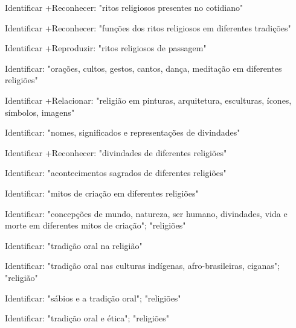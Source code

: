 Identificar +Reconhecer: "ritos religiosos presentes no cotidiano"

 Identificar +Reconhecer: "funções dos ritos religiosos em diferentes tradições"

 Identificar +Reproduzir: "ritos religiosos de passagem"

 Identificar: "orações, cultos, gestos, cantos, dança, meditação em diferentes religiões"

 Identificar +Relacionar: "religião em pinturas, arquitetura, esculturas, ícones, símbolos, imagens"

 Identificar: "nomes, significados e representações de divindades"

 Identificar +Reconhecer: "divindades de diferentes religiões"

 Identificar: "acontecimentos sagrados de diferentes religiões"

 Identificar: "mitos de criação em diferentes religiões"

 Identificar: "concepções de mundo, natureza, ser humano, divindades, vida e morte em diferentes mitos de criação"; "religiões"

 Identificar: "tradição oral na religião"

 Identificar: "tradição oral nas culturas indígenas, afro-brasileiras, ciganas"; "religião"

 Identificar: "sábios e a tradição oral"; "religiões"

 Identificar: "tradição oral e ética"; "religiões"
